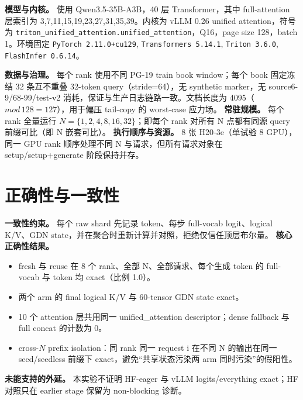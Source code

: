 \documentclass[11pt]{article}
\begin{document}
\textbf{模型与内核。} 使用 Qwen3.5-35B-A3B，40 层 Transformer，其中 full-attention 层索引为 3,7,11,15,19,23,27,31,35,39。内核为 vLLM 0.26 unified attention，符号为 \verb|triton_unified_attention.unified_attention|，Q16，page size 128，batch 1。环境固定 \texttt{PyTorch 2.11.0+cu129}, \texttt{Transformers 5.14.1}, \texttt{Triton 3.6.0}, \texttt{FlashInfer 0.6.14}。

\textbf{数据与治理。} 每个 rank 使用不同 PG-19 train book window；每个 book 固定冻结 32 条互不重叠 32-token query（stride=64），无 synthetic marker，无 source6-9/68-99/test-v2 消耗，保证与生产日志链路一致。文档长度为 4095（$mod\,128=127$），用于偏压 tail-copy 的 worst-case 应力场。  
\textbf{常驻规模。} 每个 rank 全量运行 $N=\{1,2,4,8,16,32\}$；即每个 rank 对所有 N 点都有同源 query 前缀可比（即 N 嵌套可比）。  
\textbf{执行顺序与资源。} 8 张 H20-3e（单试验 8 GPU），同一 GPU rank 顺序处理不同 N 与请求，但所有请求对象在 setup/setup+generate 阶段保持并存。

\section{正确性与一致性}
\textbf{一致性约束。} 每个 raw shard 先记录 token、每步 full-vocab logit、logical K/V、GDN state，并在聚合时重新计算并对照，拒绝仅信任顶层布尔量。
\textbf{核心正确性结果。}
\begin{itemize}
  \item fresh 与 reuse 在 8 个 rank、全部 N、全部请求、每个生成 token 的 full-vocab 与 token 均 exact（比例 1.0）。  
  \item 两个 arm 的 final logical K/V 与 60-tensor GDN state exact。  
  \item 10 个 attention 层共用同一 unified\_attention descriptor；dense fallback 与 full concat 的计数为 0。  
  \item cross-$N$ prefix isolation：同 rank 同一 request i 在不同 N 的输出在同一 seed/seedless 前缀下 exact，避免“共享状态污染两 arm 同时污染”的假阳性。  
\end{itemize}
\textbf{未能支持的外延。} 本实验不证明 HF-eager 与 vLLM logits/everything exact；HF 对照只在 earlier stage 保留为 non-blocking 诊断。
\end{document}
